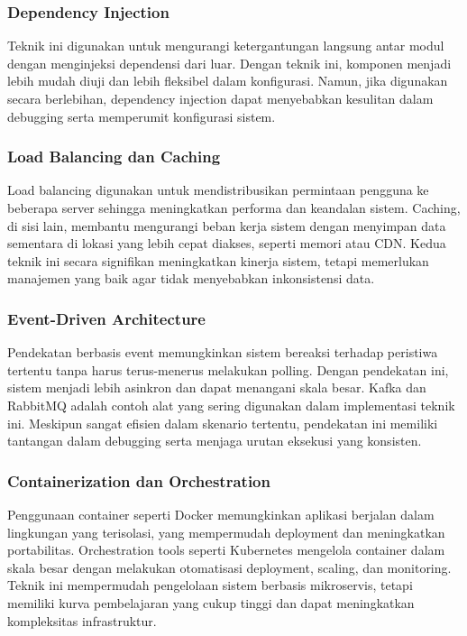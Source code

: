 \subsubsection{Dependency Injection}
Teknik ini digunakan untuk mengurangi ketergantungan langsung antar modul dengan menginjeksi dependensi dari luar. Dengan teknik ini, komponen menjadi lebih mudah diuji dan lebih fleksibel dalam konfigurasi. Namun, jika digunakan secara berlebihan, dependency injection dapat menyebabkan kesulitan dalam debugging serta memperumit konfigurasi sistem.

\subsubsection{Load Balancing dan Caching}
Load balancing digunakan untuk mendistribusikan permintaan pengguna ke beberapa server sehingga meningkatkan performa dan keandalan sistem. Caching, di sisi lain, membantu mengurangi beban kerja sistem dengan menyimpan data sementara di lokasi yang lebih cepat diakses, seperti memori atau CDN. Kedua teknik ini secara signifikan meningkatkan kinerja sistem, tetapi memerlukan manajemen yang baik agar tidak menyebabkan inkonsistensi data.

\subsubsection{Event-Driven Architecture}
Pendekatan berbasis event memungkinkan sistem bereaksi terhadap peristiwa tertentu tanpa harus terus-menerus melakukan polling. Dengan pendekatan ini, sistem menjadi lebih asinkron dan dapat menangani skala besar. Kafka dan RabbitMQ adalah contoh alat yang sering digunakan dalam implementasi teknik ini. Meskipun sangat efisien dalam skenario tertentu, pendekatan ini memiliki tantangan dalam debugging serta menjaga urutan eksekusi yang konsisten.

\subsubsection{Containerization dan Orchestration}
Penggunaan container seperti Docker memungkinkan aplikasi berjalan dalam lingkungan yang terisolasi, yang mempermudah deployment dan meningkatkan portabilitas. Orchestration tools seperti Kubernetes mengelola container dalam skala besar dengan melakukan otomatisasi deployment, scaling, dan monitoring. Teknik ini mempermudah pengelolaan sistem berbasis mikroservis, tetapi memiliki kurva pembelajaran yang cukup tinggi dan dapat meningkatkan kompleksitas infrastruktur.

